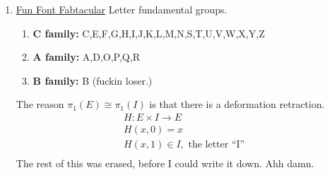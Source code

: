 \begin{enumerate}
\begin{enumerate}
\begin{proof}
\begin{align*}
                    \end{align*}
                    Note that $r$ is a homotopy relative to $x_0$, and
                    that the next step follows from the theorem from the beginning of
                    last class.
                    \begin{align*}
                        \implies i_* \circ s_* = id: \pi_1(X,x_0)\rightarrow\pi_1(X,x_0)\\
                    \end{align*}
                    So we have:
                    \begin{align*}
                        \pi_1(X,x_0)\leftrightharpoons\pi_1(A,x_0)\\
                        s_*:\pi_1(X,x_0)\rightarrow\pi_1(A,x_0)\\
                        i_*:\pi_1(A,x_0)\rightarrow\pi_1(X,x_0)\\
                    \end{align*}
                    and we've shown $s_*$ and $i_*$ are inverses, giving
                    \begin{align*}
                        \pi_1(X,x_0)\cong\pi_1(A,x_0)\\
                    \end{align*}
                \end{proof}
        \end{enumerate}
    \item \underline{Fun Font Fabtacular}
        Letter fundamental groups.
        \begin{enumerate}
            \item \textbf{C family:} C,E,F,G,H,I,J,K,L,M,N,S,T,U,V,W,X,Y,Z
            \item \textbf{A family:} A,D,O,P,Q,R
            \item \textbf{B family:} B (fuckin loser.)
        \end{enumerate}
        The reason $\pi_1(E)\cong\pi_1(I)$ is that there
        is a deformation retraction.
        \begin{align*}
            H: E\times I \rightarrow E\\
            H(x,0)=x\\
            H(x,1)\in I, \text{ the letter ``I'' }\\
        \end{align*}
        The rest of this was erased, before I could write it down. Ahh damn.\\

\end{enumerate}
